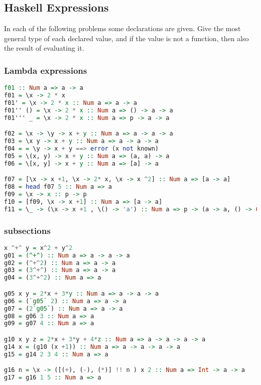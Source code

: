 \hypertarget{haskell-expressions}{%
\subsection{Haskell Expressions}\label{haskell-expressions}}

In each of the following problems some declarations are given. Give the
most general type of each declared value, and if the value is not a
function, then also the result of evaluating it.

\clearpage
\hypertarget{lambda-expressions}{%
\subsubsection{Lambda expressions}\label{lambda-expressions}}

\begin{lstlisting}[language=Haskell]
f01 :: Num a => a -> a
f01 = \x -> 2 * x
f01' = \x -> 2 * x :: Num a => a -> a
f01'' () = \x -> 2 * x :: Num a => () -> a -> a
f01''' _ = \x -> 2 * x :: Num a => p -> a -> a

f02 = \x -> \y -> x + y :: Num a => a -> a -> a
f03 = \x y -> x + y :: Num a => a -> a -> a
f04 = = \y -> x + y ==> error (x not known)
f05 = \(x, y) -> x + y :: Num a => (a, a) -> a
f06 = \[x, y] -> x + y :: Num a => [a] -> a

f07 = [\x -> x +1, \x -> 2* x, \x -> x ^2] :: Num a => [a -> a]
f08 = head f07 5 :: Num a => a
f09 = \x -> x :: p -> p
f10 = [f09, \x -> x +1] :: Num a => [a -> a]
f11 = \_ -> (\x -> x +1 , \() -> 'a') :: Num a => p -> (a -> a, () -> Char)
\end{lstlisting}

\hypertarget{subsections}{%
\subsubsection{subsections}\label{subsections}}

\begin{lstlisting}[language=Haskell]
x ^+^ y = x^2 + y^2
g01 = (^+^) :: Num a => a -> a -> a
g02 = (^+^2) :: Num a => a -> a
g03 = (3^+^) :: Num a => a -> a
g04 = (3^+^2) :: Num a => a

g05 x y = 2*x + 3*y :: Num a => a -> a -> a
g06 = (`g05` 2) :: Num a => a -> a
g07 = (2`g05`) :: Num a => a -> a
g08 = g06 3 :: Num a => a
g09 = g07 4 :: Num a => a

g10 x y z = 2*x + 3*y + 4*z :: Num a => a -> a -> a -> a
g14 x = (g10 (x +1)) :: Num a => a -> a -> a -> a
g15 = g14 2 3 4 :: Num a => a

g16 n = \x -> ([(+), (-), (*)] !! n ) x 2 :: Num a => Int -> a -> a
g17 = g16 1 5 :: Num a => a
\end{lstlisting}

